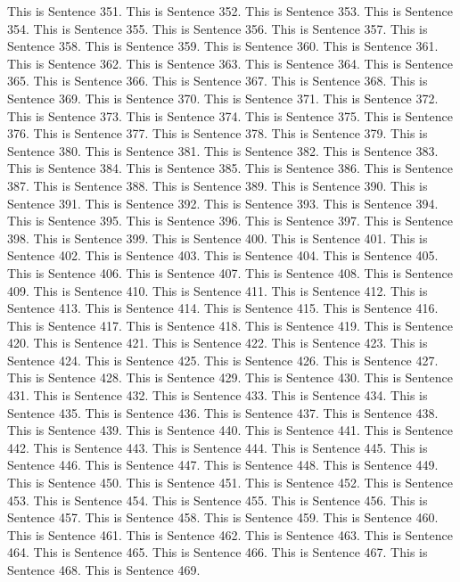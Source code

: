 \documentclass{article}
\begin{document}
This is Sentence 351.
This is Sentence 352.
This is Sentence 353.
This is Sentence 354.
This is Sentence 355.
This is Sentence 356.
This is Sentence 357.
This is Sentence 358.
This is Sentence 359.
This is Sentence 360.
This is Sentence 361.
This is Sentence 362.
This is Sentence 363.
This is Sentence 364.
This is Sentence 365.
This is Sentence 366.
This is Sentence 367.
This is Sentence 368.
This is Sentence 369.
This is Sentence 370.
This is Sentence 371.
This is Sentence 372.
This is Sentence 373.
This is Sentence 374.
This is Sentence 375.
This is Sentence 376.
This is Sentence 377.
This is Sentence 378.
This is Sentence 379.
This is Sentence 380.
This is Sentence 381.
This is Sentence 382.
This is Sentence 383.
This is Sentence 384.
This is Sentence 385.
This is Sentence 386.
This is Sentence 387.
This is Sentence 388.
This is Sentence 389.
This is Sentence 390.
This is Sentence 391.
This is Sentence 392.
This is Sentence 393.
This is Sentence 394.
This is Sentence 395.
This is Sentence 396.
This is Sentence 397.
This is Sentence 398.
This is Sentence 399.
This is Sentence 400.
This is Sentence 401.
This is Sentence 402.
This is Sentence 403.
This is Sentence 404.
This is Sentence 405.
This is Sentence 406.
This is Sentence 407.
This is Sentence 408.
This is Sentence 409.
This is Sentence 410.
This is Sentence 411.
This is Sentence 412.
This is Sentence 413.
This is Sentence 414.
This is Sentence 415.
This is Sentence 416.
This is Sentence 417.
This is Sentence 418.
This is Sentence 419.
This is Sentence 420.
This is Sentence 421.
This is Sentence 422.
This is Sentence 423.
This is Sentence 424.
This is Sentence 425.
This is Sentence 426.
This is Sentence 427.
This is Sentence 428.
This is Sentence 429.
This is Sentence 430.
This is Sentence 431.
This is Sentence 432.
This is Sentence 433.
This is Sentence 434.
This is Sentence 435.
This is Sentence 436.
This is Sentence 437.
This is Sentence 438.
This is Sentence 439.
This is Sentence 440.
This is Sentence 441.
This is Sentence 442.
This is Sentence 443.
This is Sentence 444.
This is Sentence 445.
This is Sentence 446.
This is Sentence 447.
This is Sentence 448.
This is Sentence 449.
This is Sentence 450.
This is Sentence 451.
This is Sentence 452.
This is Sentence 453.
This is Sentence 454.
This is Sentence 455.
This is Sentence 456.
This is Sentence 457.
This is Sentence 458.
This is Sentence 459.
This is Sentence 460.
This is Sentence 461.
This is Sentence 462.
This is Sentence 463.
This is Sentence 464.
This is Sentence 465.
This is Sentence 466.
This is Sentence 467.
This is Sentence 468.
This is Sentence 469.
\end{document}
